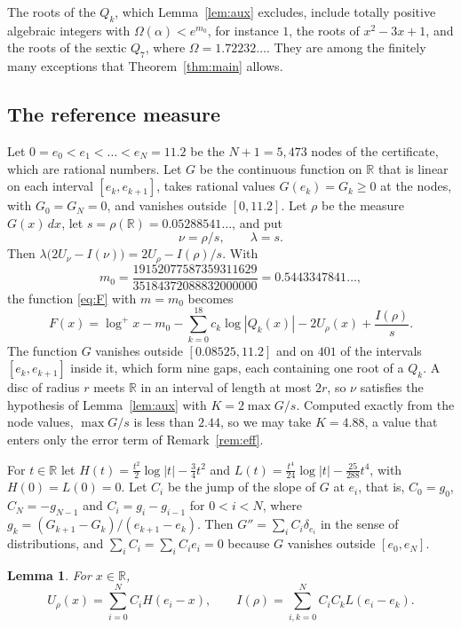 \documentclass[11pt]{amsart}
\newtheorem{lemma}[theorem]{Lemma}
\theoremstyle{remark}
\numberwithin{equation}{section}
\newcommand{\R}{\mathbb{R}}
\newcommand{\logp}{\log^{+}}
\newcommand{\MzeroDec}{0.5443347841}
\newcommand{\NNodes}{5{,}473}
\newcommand{\Sval}{0.05288541}
\newcommand{\Kconst}{4.88}
\newcommand{\GmaxRatio}{2.44}
\newcommand{\SuppLo}{0.08525}
\newcommand{\SuppHi}{11.2}
\newcommand{\NZero}{401}
\begin{document}
The roots of the $Q_k$, which Lemma~\ref{lem:aux} excludes, include totally positive algebraic integers with $\Omega(\alpha)<e^{m_0}$, for instance $1$, the roots of $x^2-3x+1$, and the roots of the sextic $Q_7$, where $\Omega=1.72232\ldots$. They are among the finitely many exceptions that Theorem~\ref{thm:main} allows.

\subsection{The reference measure}
Let $0=e_0<e_1<\dots<e_N=\SuppHi$ be the $N+1=\NNodes$ nodes of the certificate, which are rational numbers. Let $G$ be the continuous function on $\R$ that is linear on each interval $[e_k,e_{k+1}]$, takes rational values $G(e_k)=G_k\ge0$ at the nodes, with $G_0=G_N=0$, and vanishes outside $[0,\SuppHi]$. Let $\rho$ be the measure $G(x)\,dx$, let $s=\rho(\R)=\Sval\ldots$, and put
\[
\nu=\rho/s,\qquad\lambda=s.
\]
Then $\lambda\bigl(2U_\nu-I(\nu)\bigr)=2U_\rho-I(\rho)/s$. With
\begin{equation}\label{eq:m0}
m_0=\frac{19152077587359311629}{35184372088832000000}=\MzeroDec\ldots,
\end{equation}
the function \eqref{eq:F} with $m=m_0$ becomes
\begin{equation}\label{eq:Fcert}
F(x)=\logp x-m_0-\sum_{k=0}^{18}c_k\log|Q_k(x)|-2U_\rho(x)+\frac{I(\rho)}s.
\end{equation}
The function $G$ vanishes outside $[\SuppLo,\SuppHi]$ and on $\NZero$ of the intervals $[e_k,e_{k+1}]$ inside it, which form nine gaps, each containing one root of a $Q_k$. A disc of radius $r$ meets $\R$ in an interval of length at most $2r$, so $\nu$ satisfies the hypothesis of Lemma~\ref{lem:aux} with $K=2\max G/s$. Computed exactly from the node values, $\max G/s$ is less than $\GmaxRatio$, so we may take $K=\Kconst$, a value that enters only the error term of Remark~\ref{rem:eff}.

For $t\in\R$ let $H(t)=\frac{t^2}2\log|t|-\frac34t^2$ and $L(t)=\frac{t^4}{24}\log|t|-\frac{25}{288}t^4$, with $H(0)=L(0)=0$. Let $C_i$ be the jump of the slope of $G$ at $e_i$, that is, $C_0=g_0$, $C_N=-g_{N-1}$ and $C_i=g_i-g_{i-1}$ for $0<i<N$, where $g_k=(G_{k+1}-G_k)/(e_{k+1}-e_k)$. Then $G''=\sum_iC_i\delta_{e_i}$ in the sense of distributions, and $\sum_iC_i=\sum_iC_ie_i=0$ because $G$ vanishes outside $[e_0,e_N]$.

\begin{lemma}\label{lem:closed}
For $x\in\R$,
\[
U_\rho(x)=\sum_{i=0}^NC_iH(e_i-x),\qquad I(\rho)=\sum_{i,k=0}^NC_iC_kL(e_i-e_k).
\]
\end{lemma}
\end{document}
